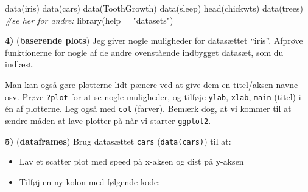 \documentclass[
]{book}
\newenvironment{Shaded}{\begin{snugshade}}{\end{snugshade}}
\newcommand{\AttributeTok}[1]{\textcolor[rgb]{0.77,0.63,0.00}{#1}}
\newcommand{\CommentTok}[1]{\textcolor[rgb]{0.56,0.35,0.01}{\textit{#1}}}
\newcommand{\DecValTok}[1]{\textcolor[rgb]{0.00,0.00,0.81}{#1}}
\newcommand{\FunctionTok}[1]{\textcolor[rgb]{0.00,0.00,0.00}{#1}}
\newcommand{\NormalTok}[1]{#1}
\newcommand{\OtherTok}[1]{\textcolor[rgb]{0.56,0.35,0.01}{#1}}
\newcommand{\SpecialCharTok}[1]{\textcolor[rgb]{0.00,0.00,0.00}{#1}}
\newcommand{\StringTok}[1]{\textcolor[rgb]{0.31,0.60,0.02}{#1}}
\providecommand{\tightlist}{%
  \setlength{\itemsep}{0pt}\setlength{\parskip}{0pt}}
\begin{document}
\begin{Shaded}
\begin{Highlighting}[]
\FunctionTok{data}\NormalTok{(iris)}
\FunctionTok{data}\NormalTok{(cars)}
\FunctionTok{data}\NormalTok{(ToothGrowth)}
\FunctionTok{data}\NormalTok{(sleep)}
\FunctionTok{head}\NormalTok{(chickwts)}
\FunctionTok{data}\NormalTok{(trees)}
\CommentTok{\#se her for andre:}
\FunctionTok{library}\NormalTok{(}\AttributeTok{help =} \StringTok{"datasets"}\NormalTok{)}
\end{Highlighting}
\end{Shaded}

\textbf{4)} (\textbf{baserende plots}) Jeg giver nogle muligheder for datasættet ``iris''. Afprøve funktionerne for nogle af de andre ovenstående indbygget datasæt, som du indlæst.

\begin{Shaded}
\end{Shaded}

Man kan også gøre plotterne lidt pænere ved at give dem en titel/aksen-navne osv. Prøve \texttt{?plot} for at se nogle muligheder, og tilføje \texttt{ylab}, \texttt{xlab}, \texttt{main} (titel) i én af plotterne. Leg også med \texttt{col} (farver). Bemærk dog, at vi kommer til at ændre måden at lave plotter på når vi starter \texttt{ggplot2}.

\textbf{5)} (\textbf{dataframes}) Brug datasættet \texttt{cars} (\texttt{data(cars)}) til at:

\begin{itemize}
\tightlist
\item
  Lav et scatter plot med speed på x-aksen og dist på y-aksen
\item
  Tilføj en ny kolon med følgende kode:
\end{itemize}

\begin{Shaded}
\end{Shaded}
\end{document}
